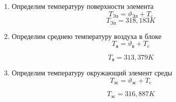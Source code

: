 \begin{enumerate}[label={\arabic*.}]
  \item Определим температуру поверхности элемента
    \begin{equation}
      T\mathrm{_{Эл}} = \vartheta\mathrm{_{Эл}} + T\mathrm{_c}
    \end{equation}
    $$T\mathrm{_{Эл}} = 318,183K$$

  \item Определим среднею температуру воздуха в блоке
    \begin{equation}
      T\mathrm{_в} = \vartheta\mathrm{_в} + T\mathrm{_c}
    \end{equation}

    $$T\mathrm{_в} =313,379 K$$
  \item Определим температуру окружающий элемент среды
    \begin{equation}
      T\mathrm{_{эс}} = \vartheta\mathrm{_{эс}} + T\mathrm{_c}
    \end{equation}
    
    $$T\mathrm{_{эс}} = 316,887 K$$


\end{enumerate}

